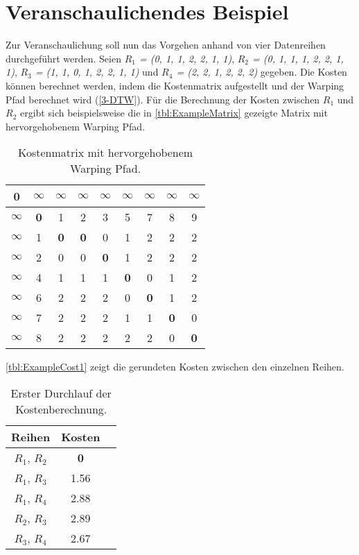 \section{Veranschaulichendes Beispiel}
\label{3-Example}
Zur Veranschaulichung soll nun das Vorgehen anhand von vier Datenreihen durchgeführt werden.
Seien \emph{$R_{1}$ = (0, 1, 1, 2, 2, 1, 1)}, \emph{$R_{2}$ = (0, 1, 1, 1, 2, 2, 1, 1)}, \emph{$R_{3}$ = (1, 1, 0, 1, 2, 2, 1, 1)}
und \emph{$R_{4}$ = (2, 2, 1, 2, 2, 2)} gegeben.
Die Kosten können berechnet werden, indem die Kostenmatrix aufgestellt und der Warping Pfad berechnet wird (\autoref{3-DTW}).
Für die Berechnung der Kosten zwischen \emph{$R_{1}$} und \emph{$R_{2}$} ergibt sich beispielsweise
die in \autoref{tbl:ExampleMatrix} gezeigte Matrix
mit hervorgehobenem Warping Pfad.
\begin{table}[ht]
    \begin{center}
    \begin{tabular}{ |c||c|c|c|c|c|c|c|c| } 
     \hline
     \textbf{0} & $\infty$ & $\infty$ & $\infty$
     & $\infty$ & $\infty$ & $\infty$ & $\infty$ & $\infty$ \\
     \hline
     \hline
     $\infty$ &\textbf{0} & 1 & 2 & 3 & 5 & 7 & 8 & 9 \\
     \hline
     $\infty$ & 1 & \textbf{0} & \textbf{0} & 0 & 1 & 2 & 2 & 2 \\
     \hline
     $\infty$ & 2 & 0 & 0 & \textbf{0} & 1 & 2 & 2 & 2 \\
     \hline
     $\infty$ & 4 & 1 & 1 & 1 & \textbf{0} & 0 & 1 & 2 \\
     \hline
     $\infty$ & 6 & 2 & 2 & 2 & 0 & \textbf{0} & 1 & 2 \\
     \hline
     $\infty$ & 7 & 2 & 2 & 2 & 1 & 1 & \textbf{0} & 0 \\
     \hline
     $\infty$ & 8 & 2 & 2 & 2 & 2 & 2 & 0 & \textbf{0} \\
     \hline
    \end{tabular}
    \caption{Kostenmatrix mit hervorgehobenem Warping Pfad.}
    \label{tbl:ExampleMatrix}
    \end{center}
\end{table}
\autoref{tbl:ExampleCost1} zeigt die gerundeten Kosten zwischen den einzelnen Reihen.
\begin{table}[ht]
    \begin{center}
    \begin{tabular}{ |c|c|c| } 
     \hline
     Reihen & Kosten \\
     \hline \hline
     $R_{1}$, $R_{2}$ & \textbf{0} \\
     \hline
     $R_{1}$, $R_{3}$ & 1.56 \\
     \hline
     $R_{1}$, $R_{4}$ & 2.88 \\
     \hline
     $R_{2}$, $R_{3}$ & 2.89 \\
     \hline
     $R_{3}$, $R_{4}$ & 2.67 \\
     \hline
    \end{tabular}
    \caption{Erster Durchlauf der Kostenberechnung.}
    \label{tbl:ExampleCost1}
    \end{center}
\end{table}
